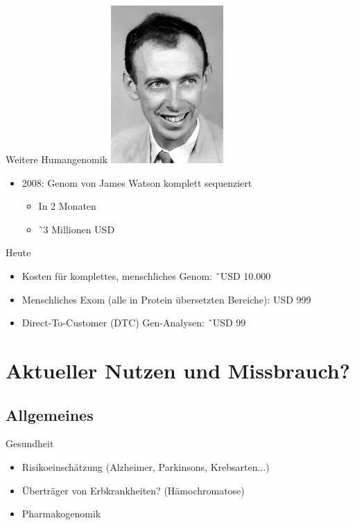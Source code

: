 \documentclass[12pt,a4paper]{beamer}
\begin{document}
\begin{frame}{Weitere Humangenomik}
	\includegraphics[scale=0.4]{watson.jpg}
	\begin{itemize}
		\item 2008: Genom von James Watson komplett sequenziert
		\begin{itemize}
			\pause \item In 2 Monaten
			\pause \item \~\ 3 Millionen USD
		\end{itemize}
	\end{itemize}
\end{frame}

\begin{frame}{Heute}
	\begin{itemize}
		\item Kosten f\"ur komplettes, menschliches Genom: \~\ USD 10.000
		\item Menschliches Exom (alle in Protein \"ubersetzten Bereiche): USD 999  
		\item Direct-To-Customer (DTC) Gen-Analysen: \~\ USD 99
	\end{itemize}
\end{frame}

\section{Aktueller Nutzen und Missbrauch?}

\subsection{Allgemeines}

\begin{frame}{Gesundheit}
	\begin{itemize}
		\item Risikoeinsch\"atzung (Alzheimer, Parkinsons, Krebsarten...)
		\pause \item \"Ubertr\"ager von Erbkrankheiten? (H\"amochromatose)
		\pause \item Pharmakogenomik 
	\end{itemize}
\end{frame}
\end{document}
